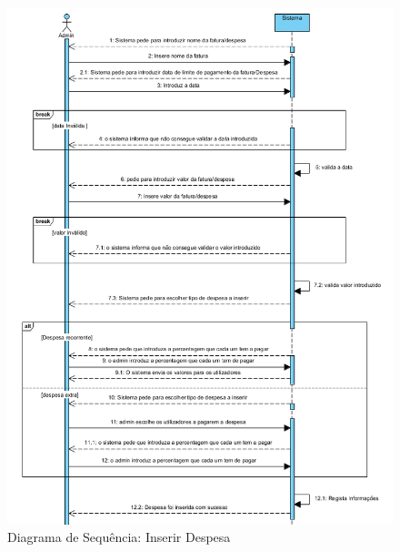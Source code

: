 \begin{figure}[htb!]
	\centering
	\includegraphics[scale=0.5]{imagens/DiagramaSeq/InserirDespesa}  
	\caption{Diagrama de Sequência: Inserir Despesa}  
\end{figure}

